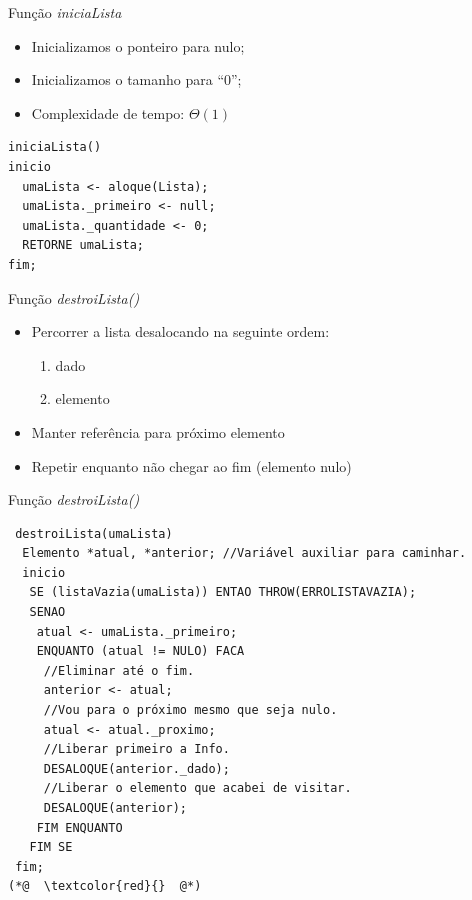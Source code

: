 \documentclass[12pt,table,xcolor={dvipsnames}]{beamer}
\begin{document}
\begin{frame}[fragile]{Função \textit{iniciaLista}}

\begin{itemize}
\item Inicializamos o ponteiro para nulo;
\item Inicializamos o tamanho para ``0'';
\item Complexidade de tempo: $\Theta(1)$
\end{itemize}
\begin{lstlisting}
iniciaLista()
inicio
  umaLista <- aloque(Lista);
  umaLista._primeiro <- null;
  umaLista._quantidade <- 0;
  RETORNE umaLista;
fim;
\end{lstlisting}
\end{frame}

\begin{frame}[fragile]{Função \textit{destroiLista()}}
	\begin{itemize}
	\item Percorrer a lista desalocando na seguinte ordem:
	\begin{enumerate} 
		\item dado
		\item elemento
	\end{enumerate}
	\item Manter referência para próximo elemento
	\item Repetir enquanto não chegar ao fim (elemento nulo)
	\end{itemize}
\end{frame}

\begin{frame}[fragile]{Função \textit{destroiLista()}}
	\begin{lstlisting}
 destroiLista(umaLista)
  Elemento *atual, *anterior; //Variável auxiliar para caminhar.
  inicio
   SE (listaVazia(umaLista)) ENTAO THROW(ERROLISTAVAZIA);
   SENAO
    atual <- umaLista._primeiro;    
    ENQUANTO (atual != NULO) FACA 
     //Eliminar até o fim.
     anterior <- atual;
     //Vou para o próximo mesmo que seja nulo.
     atual <- atual._proximo;
     //Liberar primeiro a Info.
     DESALOQUE(anterior._dado);
     //Liberar o elemento que acabei de visitar.
     DESALOQUE(anterior);
    FIM ENQUANTO
   FIM SE
 fim;
(*@  \textcolor{red}{}  @*)
\end{lstlisting}
\end{frame}
\end{document}

